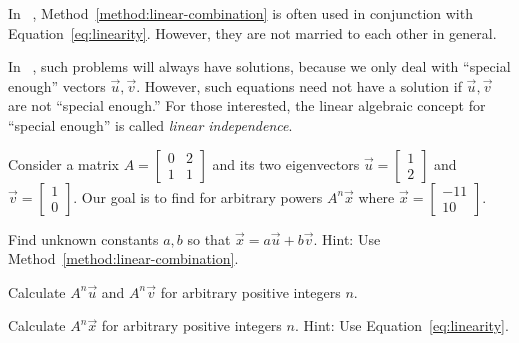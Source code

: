 \documentclass[../main.tex]{subfiles}
\begin{document}
\faStar{} In \thecoursesubject{}~\thecoursenumb{}, Method~\ref{method:linear-combination} is often used in conjunction with Equation~\ref{eq:linearity}. However, they are not married to each other in general. 

{\footnotesize \faExclamationTriangle{} In \thecoursesubject{}~\thecoursenumb{}, such problems will always have solutions, because we only deal with ``special enough'' vectors \(\vec{u}, \vec{v}\). However, such equations need not have a solution if \(\vec{u}, \vec{v}\) are not ``special enough.'' For those interested, the linear algebraic concept for ``special enough'' is called \emph{linear independence}.}
\clearpage

Consider a matrix \(A = \begin{bmatrix} 0 & 2 \\ 1 & 1 \end{bmatrix}\) and its two eigenvectors \(\vec{u} = \begin{bmatrix} 1 \\ 2 \end{bmatrix}\) and \(\vec{v} = \begin{bmatrix} 1 \\ 0 \end{bmatrix}\).  Our goal is to find  for arbitrary powers \(A^{n} \vec{x}\) where \(\vec{x} = \begin{bmatrix} -11 \\ 10 \end{bmatrix}\).

\begin{example} \label{ex:linear-combination}
  Find unknown constants \(a,b\) so that \(\vec{x} = a \vec{u} + b \vec{v}\). Hint: Use Method~\ref{method:linear-combination}.

\end{example}

\begin{example}
  Calculate \(A^{n} \vec{u}\) and \(A^{n} \vec{v}\) for arbitrary positive integers \(n\). 

\end{example}

\begin{example}
  Calculate \(A^{n} \vec{x}\) for arbitrary positive integers \(n\). Hint: Use Equation~\eqref{eq:linearity}.

\end{example}
\clearpage
\end{document}
